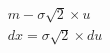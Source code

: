 \documentclass[preview]{standalone}
\begin{document}
\begin{align*}
m - \sigma \sqrt{2} \times u\\dx = \sigma \sqrt{2} \times du\\ \\ \\ \\
\end{align*}
\end{document}

